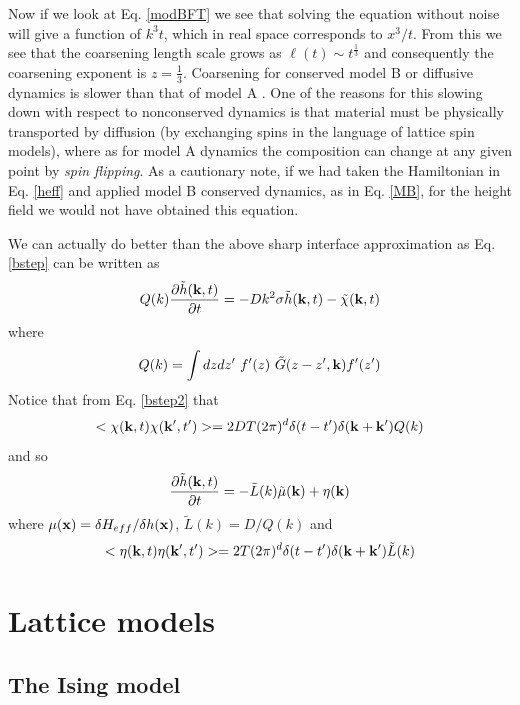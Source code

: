 Now if we look at Eq. \eqref{modBFT} we see that solving the equation without noise will give a function of $k^3t$, which in real space corresponds to $x^3/t$. From this we see that the coarsening length scale grows as $\ell(t) \sim t^{\frac{1}{3}}$ and consequently the coarsening exponent is $z=\frac{1}{3}$.  Coarsening for conserved model B or diffusive dynamics is slower than that of model A \cite{huse_corrections_1986}. One of the reasons for this slowing down with respect to nonconserved dynamics is that material must be physically transported by diffusion (by exchanging spins in the language of lattice spin models), where as for  model A dynamics the composition can change at any given point by {\em spin flipping}. As a cautionary note, if we had taken the Hamiltonian in Eq. \eqref{heff} and applied model B conserved dynamics, as in Eq. \eqref{MB},  for the height field we would not have obtained this equation. 

We can actually do better than the above sharp interface approximation as Eq. \eqref{bstep} can be written as
\begin{equation}
    Q(k)\frac{\partial\tilde h({\bf k},t)}{\partial t} =  -Dk^2\sigma \tilde h({\bf k},t) - \tilde \chi({\bf k},t)
    \label{bstep2}
\end{equation}
where 
\begin{equation}
    Q(k)= \int dzdz' \ f'(z)\ \tilde G(z-z',{\bf k}) f'(z')
\end{equation}
Notice that from Eq. \eqref{bstep2} that
\begin{equation}
    < \chi({\bf k},t)\chi({\bf k}',t')>  = 2DT(2\pi)^d \delta(t-t') \delta({\bf k}+{\bf k'}) Q(k)\end{equation}
and so 
\begin{equation}
    \frac{\partial\tilde h({\bf k},t)}{\partial t}= -\tilde L(k) \tilde \mu({\bf k}) + \eta({\bf k})
\end{equation}
where $\mu({\bf x})=\delta H_{eff}/\delta h({\bf x}) $, $\tilde L(k) = D/Q(k)$ and 
\begin{equation}
    < \eta({\bf k},t)\eta({\bf k}',t')>  = 2T(2\pi)^d \delta(t-t') \delta({\bf k}+{\bf k'}) \tilde L(k)
\end{equation}

    \section{Lattice models}

    \subsection{The Ising model}

